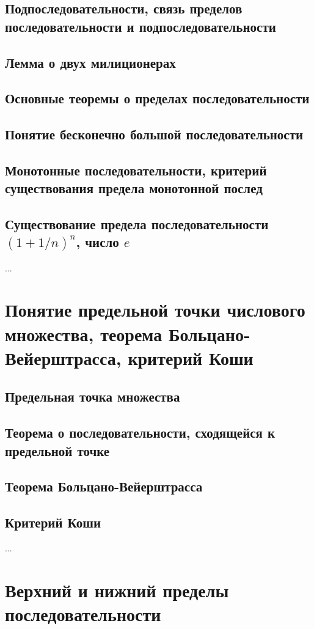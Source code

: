 \subsection{Подпоследовательности, связь пределов последовательности и подпоследовательности}
\subsection{Лемма о двух милиционерах}
\subsection{Основные теоремы о пределах последовательности}
\subsection{Понятие бесконечно большой последовательности}
\subsection{Монотонные последовательности, критерий существования предела монотонной послед}
\subsection{Существование предела последовательности $(1+1/n)^n$, число $e$ }
...

\section{Понятие предельной точки числового множества, теорема Больцано-Вейерштрасса, критерий Коши}
\subsection{Предельная точка множества}
\subsection{Теорема о последовательности, сходящейся к предельной точке}
\subsection{Теорема Больцано-Вейерштрасса}
\subsection{Критерий Коши}
...

\section{Верхний и нижний пределы последовательности}
